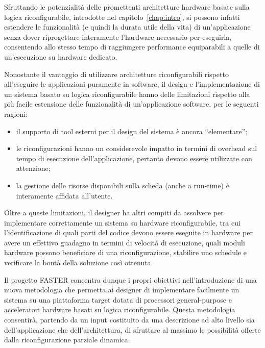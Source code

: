 Sfruttando le potenzialità delle promettenti architetture hardware basate sulla 
logica riconfigurabile, introdotte nel capitolo~\ref{chap:intro}, si possono 
infatti estendere le funzionalità (e quindi la durata utile della vita) di 
un'applicazione senza dover riprogettare interamente l'hardware necessario per 
eseguirla, consentendo allo stesso tempo di raggiungere performance
equiparabili
a quelle di un'esecuzione su hardware dedicato.

Nonostante il vantaggio di utilizzare architetture riconfigurabili rispetto 
all'eseguire le applicazioni puramente in software, il design e 
l'implementazione di un sistema basato su logica riconfigurabile hanno delle 
limitazioni rispetto alla più facile estensione delle funzionalità di 
un'applicazione software, per le seguenti ragioni:
\begin{itemize}
 \item il supporto di tool esterni per il design del sistema è ancora 
``elementare'';
 \item le riconfigurazioni hanno un considerevole impatto in termini di overhead sul 
tempo di esecuzione dell'applicazione, pertanto devono essere utilizzate con 
attenzione;
 \item la gestione delle risorse disponibili sulla scheda (anche a run-time) è 
interamente affidata all'utente.
\end{itemize}
Oltre a queste limitazioni, il designer ha altri compiti da assolvere per 
implementare correttamente un sistema su hardware riconfigurabile, tra cui 
l'identificazione di quali parti del codice devono essere eseguite in hardware 
per avere un effettivo guadagno in termini di velocità di esecuzione, quali 
moduli hardware possono beneficiare di una riconfigurazione, stabilire uno 
schedule e verificare la bontà della soluzione così ottenuta.

Il progetto \ac{FASTER} concentra dunque i propri obiettivi nell'introduzione 
di una nuova metodologia che permetta ai designer di implementare facilmente un 
sistema su una piattaforma target dotata di processori general-purpose e 
acceleratori hardware basati su logica riconfigurabile. Questa metodologia 
consentirà, partendo da un input costituito da una descrizione ad alto livello 
sia dell'applicazione che dell'architettura, di sfruttare al massimo le 
possibilità offerte dalla riconfigurazione parziale dinamica.

